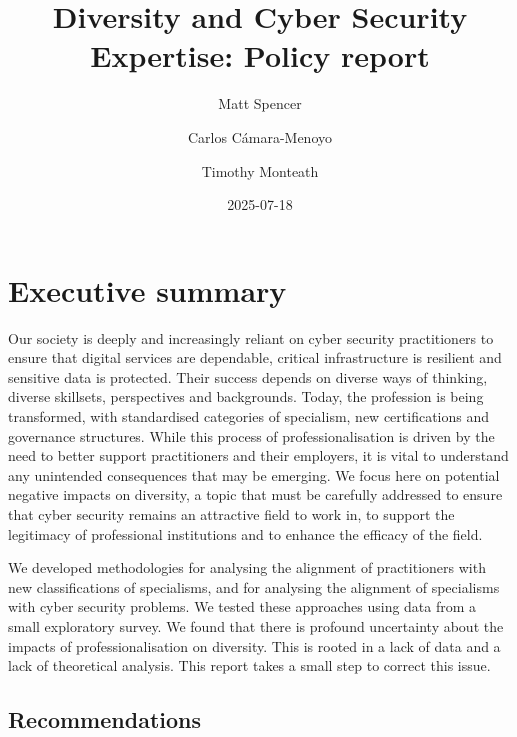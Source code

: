 \documentclass[
  a4paper,
]{book}
\title{Diversity and Cyber Security Expertise: Policy report}
\author{Matt Spencer \and Carlos Cámara-Menoyo \and Timothy Monteath}
\date{2025-07-18}
\renewcommand*\contentsname{Table of contents}
\newcommand\contentsname{Table of contents}
\begin{document}
\frontmatter
\maketitle

\renewcommand*\contentsname{Table of contents}
{
\setcounter{tocdepth}{2}
\tableofcontents
}

\mainmatter
{}

\chapter*{Executive summary}\label{executive-summary}


Our society is deeply and increasingly reliant on cyber security
practitioners to ensure that digital services are dependable, critical
infrastructure is resilient and sensitive data is protected. Their
success depends on diverse ways of thinking, diverse skillsets,
perspectives and backgrounds. Today, the profession is being
transformed, with standardised categories of specialism, new
certifications and governance structures. While this process of
professionalisation is driven by the need to better support
practitioners and their employers, it is vital to understand any
unintended consequences that may be emerging. We focus here on potential
negative impacts on diversity, a topic that must be carefully addressed
to ensure that cyber security remains an attractive field to work in, to
support the legitimacy of professional institutions and to enhance the
efficacy of the field.

We developed methodologies for analysing the alignment of practitioners
with new classifications of specialisms, and for analysing the alignment
of specialisms with cyber security problems. We tested these approaches
using data from a small exploratory survey. We found that there is
profound uncertainty about the impacts of professionalisation on
diversity. This is rooted in a lack of data and a lack of theoretical
analysis. This report takes a small step to correct this issue.

\section*{Recommendations}\label{recommendations}

\end{document}
